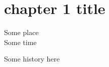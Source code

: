 \documentclass[../book/book.tex]{subfiles}
\begin{document}
\chapter{chapter 1 title}

\begin{timeAndSpace}
  Some place \\
  Some time
\end{timeAndSpace}

Some history here
\end{document}
